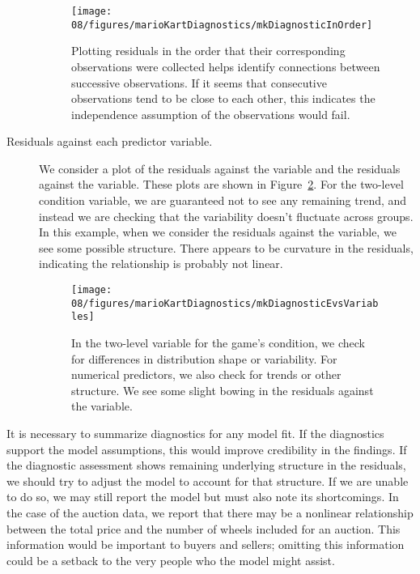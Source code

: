 \begin{description}
\begin{figure}
\centering
\texttt{[image: 08/figures/marioKartDiagnostics/mkDiagnosticInOrder]}
\caption{Plotting residuals in the order that their corresponding observations were collected helps identify connections between successive observations. If it seems that consecutive observations tend to be close to each other, this indicates the independence assumption of the observations would fail.}
\label{mkDiagnosticInOrder}
\end{figure}

\item[Residuals against each predictor variable.] We consider a plot of the residuals against the  variable and the residuals against the  variable. These plots are shown in Figure~\ref{mkDiagnosticEvsVariables}. For the two-level condition variable, we are guaranteed not to see any remaining trend, and instead we are checking that the variability doesn't fluctuate across groups. In this example, when we consider the residuals against the  variable, we see some possible structure. There appears to be curvature in the residuals, indicating the relationship is probably not linear.

\begin{figure}
\centering
\texttt{[image: 08/figures/marioKartDiagnostics/mkDiagnosticEvsVariables]}
\caption{In the two-level variable for the game's condition, we check for differences in distribution shape or variability. For numerical predictors, we also check for trends or other structure. We see some slight bowing in the residuals against the  variable.}
\label{mkDiagnosticEvsVariables}
\end{figure}

\end{description}

It is necessary to summarize diagnostics for any model fit. If the diagnostics support the model assumptions, this would improve credibility in the findings. If the diagnostic assessment shows remaining underlying structure in the residuals, we should try to adjust the model to account for that structure. If we are unable to do so, we may still report the model but must also note its shortcomings. In the case of the auction data, we report that there may be a nonlinear relationship between the total price and the number of wheels included for an auction. This information would be important to buyers and sellers; omitting this information could be a setback to the very people who the model might assist.

